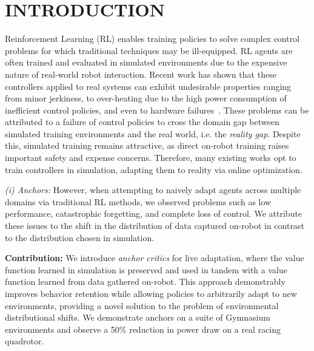 \documentclass[letterpaper, 10 pt, conference]{ieeeconf} %
\newcommand{\framework}{SwaNNS}
\begin{document}
\begin{abstract}
    
\end{abstract}


\section{INTRODUCTION}

    Reinforcement Learning (RL) enables training policies to solve complex control problems for which traditional techniques may be ill-equipped.
    RL agents are often trained and evaluated in simulated environments due to the expensive nature of real-world robot interaction.
    Recent work has shown that these controllers applied to real systems can exhibit undesirable properties ranging from minor jerkiness, to over-heating due to the high power consumption of inefficient control policies, and even to hardware failures~\cite{benchmarkingRobo, Sim2Real, Sim2multi, benchmarkingRL, NFThesis}.
    These problems can be attributed to a failure of control policies to cross the domain gap between simulated training environments and the real world, i.e. the \emph{reality gap}.
    Despite this, simulated training remains attractive, as direct on-robot training raises important safety and expense concerns.
    Therefore, many existing works opt to train controllers in simulation, adapting them to reality via online optimization.

    \textit{(i) Anchors:}
    However, when attempting to naively adapt agents across multiple domains via traditional RL methods, we observed problems such as low performance, catastrophic forgetting, and complete loss of control.
    We attribute these issues to the shift in the distribution of data captured on-robot in contrast to the distribution chosen in simulation.  
    
    \noindent\textbf{Contribution:} We introduce \emph{anchor critics} for live adaptation, where the value function learned in simulation is preserved and used in tandem with a value function learned from data gathered on-robot.
    This approach demonstrably improves behavior retention while allowing policies to arbitrarily adapt to new environments, providing a novel solution to the problem of environmental distributional shifts. We demonstrate anchors on a suite of Gymnasium environments and observe a 50\% reduction in power draw on a real racing quadrotor.
\end{document}
